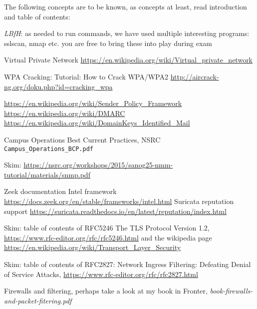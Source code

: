 \documentclass[a4paper,11pt,notitlepage,landscape]{report}
\begin{document}
The following concepts are to be known, as concepts at least, read introduction and table of contents:
\begin{list2}
\item \emph{LBfH}: as needed to run commands, we have used multiple interesting programs: sslscan, nmap etc. you are free to bring these into play during exam
\item Virtual Private Network \url{https://en.wikipedia.org/wiki/Virtual_private_network}
\item WPA Cracking: Tutorial: How to Crack WPA/WPA2 \url{http://aircrack-ng.org/doku.php?id=cracking_wpa}
\item \url{https://en.wikipedia.org/wiki/Sender_Policy_Framework}
\url{https://en.wikipedia.org/wiki/DMARC}
\url{https://en.wikipedia.org/wiki/DomainKeys_Identified_Mail}
\item Campus Operations Best Current Practices, NSRC\\
\verb+Campus_Operations_BCP.pdf+
\item Skim:
\url{https://nsrc.org/workshops/2015/sanog25-nmm-tutorial/materials/snmp.pdf}
\item Zeek documentation Intel framework \url{https://docs.zeek.org/en/stable/frameworks/intel.html}
Suricata reputation support \url{https://suricata.readthedocs.io/en/latest/reputation/index.html}

\item Skim: table of contents of RFC5246 The TLS Protocol Version 1.2, \url{https://www.rfc-editor.org/rfc/rfc5246.html}
and the wikipedia page \url{https://en.wikipedia.org/wiki/Transport_Layer_Security}

\item Skim: table of contents of RFC2827: Network Ingress Filtering: Defeating Denial of Service Attacks, \url{https://www.rfc-editor.org/rfc/rfc2827.html}


\item Firewalls and filtering, perhaps take a look at my book in Fronter, \emph{book-firewalls-and-packet-fitering.pdf}
\end{list2}
\end{document}

